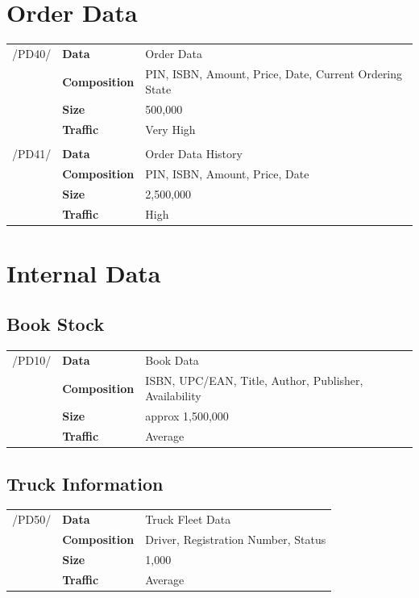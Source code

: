 \documentclass[11pt,a4paper,oneside,svgnames]{report}
\begin{document}
\section{Order Data}
\begin{tabular}{llp{10cm}}
\cellcolor{white}/PD40/	& \textbf{Data}			& Order Data\\
\cellcolor{white}		& \textbf{Composition}	& PIN, ISBN, Amount, Price, Date, Current Ordering State\\
\cellcolor{white}		& \textbf{Size}		& 500,000\\
\cellcolor{white}		& \textbf{Traffic}		& Very High\\
\cellcolor{white}\hfill \\
\cellcolor{white}/PD41/	& \textbf{Data}			& Order Data History\\
\cellcolor{white}		& \textbf{Composition}	& PIN, ISBN, Amount, Price, Date\\
\cellcolor{white}		& \textbf{Size}		& 2,500,000\\
\cellcolor{white}		& \textbf{Traffic}		& High\\
\end{tabular} 
\section{Internal Data}
\subsection{Book Stock}
\begin{tabular}{llp{10cm}}
\cellcolor{white}/PD10/	& \textbf{Data}			& Book Data\\
\cellcolor{white}		& \textbf{Composition}	& ISBN, UPC/EAN, Title, Author, Publisher, Availability\\
\cellcolor{white}		& \textbf{Size}		& approx 1,500,000\\
\cellcolor{white}		& \textbf{Traffic}		& Average\\
\end{tabular} 
\subsection{Truck Information}
\begin{tabular}{llp{10cm}}
\cellcolor{white}/PD50/	& \textbf{Data}			& Truck Fleet Data\\
\cellcolor{white}		& \textbf{Composition}	& Driver, Registration Number, Status\\
\cellcolor{white}		& \textbf{Size}		& 1,000\\
\cellcolor{white}		& \textbf{Traffic}		& Average\\
\end{tabular} 
\end{document}

